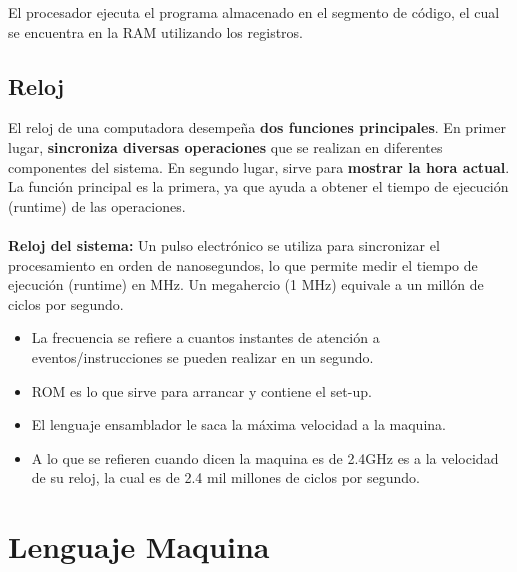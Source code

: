 \documentclass{templateNote}
\begin{document}
\noindent El procesador ejecuta el programa almacenado en el segmento de código, el cual se encuentra en la RAM utilizando los registros.

\subsection{Reloj}
\noindent El reloj de una computadora desempeña \textbf{dos funciones principales}. En primer lugar, \textbf{sincroniza diversas operaciones} que se realizan en diferentes componentes del sistema. 
En segundo lugar, sirve para \textbf{mostrar la hora actual}. La función principal es la primera, ya que ayuda a obtener el tiempo de ejecución (runtime) de las operaciones. \\\\
\textbf{Reloj del sistema:} Un pulso electrónico se utiliza para sincronizar el procesamiento en orden de nanosegundos, lo que permite medir el tiempo de ejecución (runtime) en MHz. 
Un megahercio (1 MHz) equivale a un millón de ciclos por segundo. 

\begin{tcolorbox}[colback=orange!10!white,colframe=orange!75!black,title=Observaciones]
    \begin{itemize}
        \item La frecuencia se refiere a cuantos instantes de atención a eventos/instrucciones se pueden realizar en un segundo.
        \item ROM es lo que sirve para arrancar y contiene el set-up.
        \item El lenguaje ensamblador le saca la máxima velocidad a la maquina.
        \item A lo que se refieren cuando dicen la maquina es de 2.4GHz es a la velocidad de su reloj, la cual es de 2.4 mil millones de ciclos por segundo.
    \end{itemize}
\end{tcolorbox}
\newpage

\section{Lenguaje Maquina}
\newpage
\end{document}
